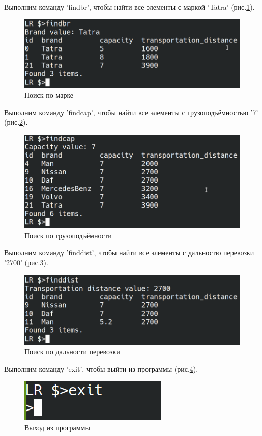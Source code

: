 Выполним команду 'findbr', чтобы найти все элементы с
маркой 'Tatra' (рис.\ref{test.findbr}).

\begin{figure}[H]
    \centering
    \includegraphics[width=0.9\linewidth]{photo/test.findbr}
    \caption{Поиск по марке}
    \label{test.findbr}
\end{figure}

Выполним команду 'findcap', чтобы найти все элементы с
грузоподъёмностью '7' (рис.\ref{test.findcap}).

\begin{figure}[H]
    \centering
    \includegraphics[width=0.9\linewidth]{photo/test.findcap}
    \caption{Поиск по грузоподъёмности}
    \label{test.findcap}
\end{figure}

Выполним команду 'finddist', чтобы найти все элементы с
дальностю перевозки '2700' (рис.\ref{test.finddist}).

\begin{figure}[H]
    \centering
    \includegraphics[width=0.9\linewidth]{photo/test.finddist}
    \caption{Поиск по дальности перевозки}
    \label{test.finddist}
\end{figure}

Выполним команду 'exit', чтобы выйти из программы (рис.\ref{test.exit}).

\begin{figure}[H]
	\centering
	\includegraphics[width=0.35\linewidth]{photo/test.exit}
	\caption{Выход из программы}
	\label{test.exit}
\end{figure}